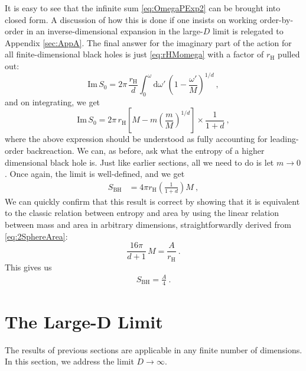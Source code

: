 \documentclass[a4paper,11pt]{article}
\newcommand{\dd}[1]{\text{d}#1 \, }
\newcommand{\im}{\text{Im} \,}
\newcommand{\rH}{r_{\text{H}}}
\begin{document}
It is easy to see that the infinite sum \eqref{eq:OmegaPExp2} can be brought into closed form. A discussion of how this is done if one insists on working order-by-order in an inverse-dimensional expansion in the large-$D$ limit is relegated to Appendix \ref{sec:AppA}. The final answer for the imaginary part of the action for all finite-dimensional black holes is just \eqref{eq:rHMomega} with a factor of $\rH$ pulled out: 
\begin{equation}
\label{eq:SummedForm}
\im S_0 = 2\pi \, \frac{\rH}{d} \int_{0}^{\omega} \dd{\omega'} \left( 1-\frac{\omega'}{M}\right)^{1/d} \ ,
\end{equation}
and on integrating, we get
\begin{equation}
\im S_0 = 2\pi \, \rH \left[ M - m \left( \frac{m}{M} \right)^{1/d} \right] \times \frac{1}{1+d} \ ,
\end{equation}
where the above expression should be understood as fully accounting for leading-order backreaction. We can, as before, ask what the entropy of a higher dimensional black hole is. Just like earlier sections, all we need to do is let $m \rightarrow 0$. Once again, the limit is well-defined, and we get
\begin{align}
\label{eq:FiniteDEntropy}
S_{\text{BH}} &= 4\pi \rH \left( \frac{1}{1+d} \right) M \ ,
\end{align}
We can quickly confirm that this result is correct by showing that it is equivalent to the classic relation between entropy and area by using the linear relation between mass and area in arbitrary dimensions, straightforwardly derived from \eqref{eq:2SphereArea}:
\begin{equation}
\frac{16 \pi}{d+1} \, M = \frac{A}{\rH} \ .
\end{equation}
This gives us
\begin{align}
S_{\text{BH}} = \frac{A}{4} \ .
\end{align}

\section{The Large-D Limit}
\label{sec:LargeD}
The results of previous sections are applicable in any finite number of dimensions. In this section, we address the limit $D \rightarrow \infty$.
\end{document}
